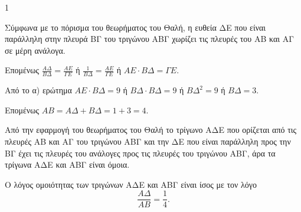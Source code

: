 \begin{ylh}{1}
    \begin{alist}
        \item Σύμφωνα με το πόρισμα του θεωρήματος του Θαλή, η ευθεία ΔΕ που είναι παράλληλη στην πλευρά ΒΓ του τριγώνου ΑΒΓ χωρίζει τις πλευρές του ΑΒ και ΑΓ σε μέρη ανάλογα.
        
        Επομένως $\frac{ΑΔ}{ΒΔ} = \frac{ΑΕ}{ΓΕ}$ ή $\frac{1}{ΒΔ} = \frac{ΑΕ}{ΓΕ}$ ή $ΑΕ \cdot ΒΔ = ΓΕ$.
        
        \item 
        \begin{rlist}
            \item Από το α) ερώτημα $ΑΕ \cdot ΒΔ = 9$ ή $ΒΔ \cdot ΒΔ = 9$ ή $ΒΔ^2 = 9$ ή $ΒΔ=3$.
            
            Επομένως $ΑΒ = ΑΔ + ΒΔ = 1 + 3 = 4$.
            
            \item Από την εφαρμογή του θεωρήματος του Θαλή το τρίγωνο ΑΔΕ που ορίζεται από τις πλευρές ΑΒ και ΑΓ του τριγώνου ΑΒΓ και την ΔΕ που είναι παράλληλη προς την ΒΓ έχει τις πλευρές του ανάλογες προς τις πλευρές του τριγώνου ΑΒΓ, άρα τα τρίγωνα ΑΔΕ και ΑΒΓ είναι όμοια.
            
            Ο λόγος ομοιότητας των τριγώνων ΑΔΕ και ΑΒΓ είναι ίσος με τον λόγο \[\frac{ΑΔ}{ΑΒ} = \frac{1}{4}.\]
        \end{rlist}
    \end{alist}
\end{ylh}